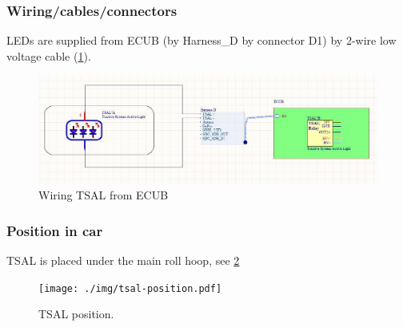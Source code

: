 \subsubsection{Wiring/cables/connectors}

LEDs are supplied from ECUB (by Harness\_D by connector D1) by 2-wire low voltage cable (\ref{fig:TSAL-wiring}).

\begin{figure}[H]
	\centering
	\includegraphics[width=\textwidth,]{./img/tsal-wiring.jpg}
	\caption{Wiring TSAL from ECUB}
	\label{fig:TSAL-wiring}
\end{figure}

\subsubsection{Position in car}
TSAL is placed under the main roll hoop, see \ref{fig:TSAL-position}

\begin{figure}[H]
	\centering
	\texttt{[image: ./img/tsal-position.pdf]}
	\caption{TSAL position.}
	\label{fig:TSAL-position}
\end{figure}
